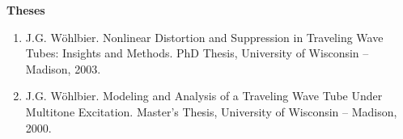 {\bf\large Theses}
\begin{enumerate}
\item J.G. W\"ohlbier. Nonlinear Distortion and Suppression in
  Traveling Wave Tubes: Insights and Methods. PhD Thesis, University
  of Wisconsin -- Madison, 2003.
\item J.G. W\"ohlbier. Modeling and Analysis of a Traveling Wave Tube
  Under Multitone Excitation. Master's Thesis, University of
  Wisconsin -- Madison, 2000.
\end{enumerate}

